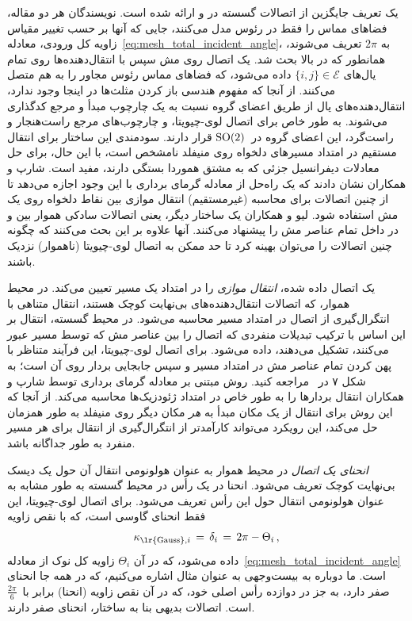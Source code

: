 یک تعریف جایگزین از اتصالات گسسته در \cite{Knoppel:2013:GOD} و \cite{Sharp2019VectorHeatMethod} ارائه شده است.
نویسندگان هر دو مقاله، فضاهای مماس را فقط در رئوس مدل می‌کنند، جایی که آنها بر حسب تغییر مقیاس زاویه کل ورودی، معادله~\eqref{eq:mesh_total_incident_angle}، به $2\pi$ تعریف می‌شوند، همانطور که در بالا بحث شد.
یک اتصال روی مش سپس با انتقال‌دهنده‌ها روی تمام یال‌های $\{i,j\} \in\mathcal{E}$ داده می‌شود، که فضاهای مماس رئوس مجاور را به هم متصل می‌کنند.
از آنجا که مفهوم هندسی باز کردن مثلث‌ها در اینجا وجود ندارد، انتقال‌دهنده‌های یال از طریق اعضای گروه نسبت به یک چارچوب مبدأ و مرجع کدگذاری می‌شوند.
به طور خاص برای اتصال لوی-چیویتا، و چارچوب‌های مرجع راست‌هنجار و راست‌گرد، این اعضای گروه در~$\operatorname{SO}(2)$ قرار دارند.
سودمندی این ساختار برای انتقال مستقیم در امتداد مسیرهای دلخواه روی منیفلد نامشخص است، با این حال، برای حل معادلات دیفرانسیل جزئی که به مشتق هموردا بستگی دارند، مفید است.
شارپ و همکاران\cite{Sharp2019VectorHeatMethod} نشان دادند که یک راه‌حل از معادله گرمای برداری با این وجود اجازه می‌دهد تا از چنین اتصالات برای محاسبه (غیرمستقیم) انتقال موازی بین نقاط دلخواه روی یک مش استفاده شود.
 لیو و همکاران \cite{liu2016discreteConnection} یک ساختار دیگر، یعنی اتصالات سادکی هموار بین و در داخل تمام عناصر مش را پیشنهاد می‌کنند.
آنها علاوه بر این بحث می‌کنند که چگونه چنین اتصالات را می‌توان بهینه کرد تا حد ممکن به اتصال لوی-چیویتا (ناهموار) نزدیک باشند.


یک اتصال داده شده، \emph{انتقال موازی} را در امتداد یک مسیر تعیین می‌کند.
در محیط هموار، که اتصالات انتقال‌دهنده‌های بی‌نهایت کوچک هستند، انتقال متناهی با انتگرال‌گیری از اتصال در امتداد مسیر محاسبه می‌شود.
در محیط گسسته، انتقال بر این اساس با ترکیب تبدیلات منفردی که اتصال را بین عناصر مش که توسط مسیر عبور می‌کنند، تشکیل می‌دهند، داده می‌شود.
برای اتصال لوی-چیویتا، این فرآیند متناظر با پهن کردن تمام عناصر مش در امتداد مسیر و سپس جابجایی بردار روی آن است؛ به شکل ۷ در~\cite{lai2009metric} مراجعه کنید.
روش مبتنی بر معادله گرمای برداری توسط شارپ و همکاران\cite{Sharp2019VectorHeatMethod} انتقال بردارها را به طور خاص در امتداد ژئودزیک‌ها محاسبه می‌کند.
از آنجا که این روش برای انتقال از یک مکان مبدأ به \emph{هر} مکان دیگر روی منیفلد به طور همزمان حل می‌کند، این رویکرد می‌تواند کارآمدتر از انتگرال‌گیری از انتقال برای هر مسیر منفرد به طور جداگانه باشد.


\emph{انحنای یک اتصال} در محیط هموار به عنوان هولونومی انتقال آن حول یک دیسک بی‌نهایت کوچک تعریف می‌شود.
انحنا در یک رأس در محیط گسسته به طور مشابه به عنوان هولونومی انتقال حول این رأس تعریف می‌شود.
برای اتصال لوی-چیویتا، این فقط انحنای گاوسی است، که با نقص زاویه
\begin{align}
    \kappa_{\textup{\lr{Gauss}},i} \,=\, \delta_i \,=\, 2\pi - \Theta_i \,,
\end{align}
داده می‌شود، که در آن $\Theta_i$ زاویه کل نوک از معادله~\eqref{eq:mesh_total_incident_angle} است.
ما دوباره به بیست‌وجهی به عنوان مثال اشاره می‌کنیم، که در همه جا انحنای صفر دارد، به جز در دوازده رأس اصلی خود، که در آن نقص زاویه (انحنا) برابر با~$\frac{2\pi}{6}$ است.
اتصالات بدیهی بنا به ساختار، انحنای صفر دارند.


